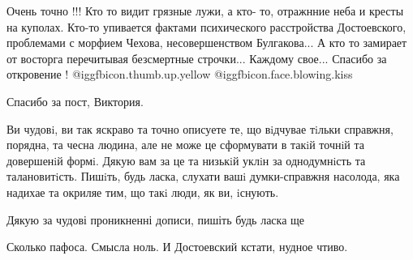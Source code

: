 \begin{itemize}

Очень точно !!! Кто то видит грязные лужи, а кто- то, отражнние неба и кресты
на куполах. Кто-то упивается фактами психического расстройства Достоевского,
проблемами с морфием Чехова, несовершенством Булгакова... А кто то замирает от
восторга перечитывая безсмертные строчки... Каждому свое... Спасибо за
откровение ! @igg{fbicon.thumb.up.yellow}  @igg{fbicon.face.blowing.kiss} 


Спасибо за пост, Виктория.


Ви чудовi, ви так яскраво та точно описуете те, що вiдчувае тiльки справжня,
порядна, та чесна людина, але не може це сформувати в такiй точнiй та
довершенiй формi. Дякую вам за це та низькiй уклiн за однодумнiсть та
талановитiсть. Пишiть, будь ласка, слухати вашi думки-справжня насолода, яка
надихае та окриляе тим, що такi люди, як ви, iснують.

Дякую за чудові проникненні дописи, пишіть будь ласка ще

Сколько пафоса. Смысла ноль. И Достоевский кстати, нудное чтиво.


\end{itemize} %
